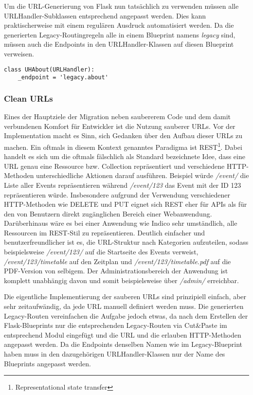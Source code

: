 Um die URL-Generierung von Flask nun tatsächlich zu verwenden müssen alle URLHandler-Subklassen
entsprechend angepasst werden. Dies kann praktischerweise mit einem regulären Ausdruck automatisiert
werden. Da die generierten Legacy-Routingregeln alle in einem Blueprint namens \emph{legacy} sind,
müssen auch die Endpoints in den URLHandler-Klassen auf diesen Blueprint verweisen.

\begin{lstlisting}[caption=Endpointbasierter URLHandler für about.py]
class UHAbout(URLHandler):
    _endpoint = 'legacy.about'
\end{lstlisting}


\subsubsection{Clean URLs}

Eines der Hauptziele der Migration neben saubererem Code und dem damit verbundenen Komfort für
Entwickler ist die Nutzung sauberer URLs. Vor der Implementation macht es Sinn, sich Gedanken über
den Aufbau dieser URLs zu machen. Ein oftmals in diesem Kontext genanntes Paradigma ist
REST\footnote{Representational state transfer}. Dabei handelt es sich um die oftmals fälschlich als
Standard bezeichnete Idee, dass eine URL genau eine Ressource bzw. Collection repräsentiert und
verschiedene HTTP-Methoden unterschiedliche Aktionen darauf ausführen. Beispiel würde \emph{/event/}
die Liste aller Events repräsentieren während \emph{/event/123} das Event mit der ID 123
repräsentieren würde. Insbesondere aufgrund der Verwendung verschiedener HTTP-Methoden wie DELETE
und PUT eignet sich REST eher für APIs als für den von Benutzern direkt zugänglichen Bereich einer
Webanwendung. Darüberhinaus wäre es bei einer Anwendung wie Indico sehr umständlich, alle Ressourcen
im REST-Stil zu repräsentieren. Deutlich einfacher und benutzerfreundlicher ist es, die URL-Struktur
nach Kategorien aufzuteilen, sodass beispielsweise \emph{/event/123/} auf die Startseite des Events
verweist, \emph{/event/123/timetable} auf den Zeitplan und \emph{/event/123/timetable.pdf} auf die
PDF-Version von selbigem. Der Administrationsbereich der Anwendung ist komplett unabhängig davon und
somit beispielsweise über \emph{/admin/} erreichbar.

Die eigentliche Implementierung der sauberen URLs sind prinzipiell einfach, aber sehr zeitaufwändig,
da jede URL manuell definiert werden muss. Die generierten Legacy-Routen vereinfachen die Aufgabe
jedoch etwas, da nach dem Erstellen der Flask-Blueprints nur die entsprechenden Legacy-Routen via
Cut\&Paste im entsprechend Modul eingefügt und die URL und die erlauben HTTP-Methoden angepasst
werden. Da die Endpoints denselben Namen wie im Legacy-Blueprint haben muss in den dazugehörigen
URLHandler-Klassen nur der Name des Blueprints angepasst werden.


